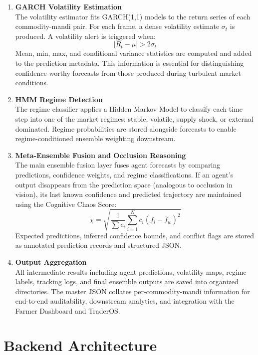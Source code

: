 \documentclass[12pt,a4paper]{report}
\theoremstyle{definition}
\theoremstyle{remark}
\begin{document}
\begin{enumerate}
\item \textbf{GARCH Volatility Estimation}\\
The volatility estimator fits GARCH(1,1) models to the return series of each commodity-mandi pair. For each frame, a dense volatility estimate $\sigma_t$ is produced. A volatility alert is triggered when:
\begin{equation}
|R_t - \mu| > 2\sigma_t
\end{equation}
Mean, min, max, and conditional variance statistics are computed and added to the prediction metadata. This information is essential for distinguishing confidence-worthy forecasts from those produced during turbulent market conditions.

\item \textbf{HMM Regime Detection}\\
The regime classifier applies a Hidden Markov Model to classify each time step into one of the market regimes: stable, volatile, supply shock, or external dominated. Regime probabilities are stored alongside forecasts to enable regime-conditioned ensemble weighting downstream.

\item \textbf{Meta-Ensemble Fusion and Occlusion Reasoning}\\
The main ensemble fusion layer fuses agent forecasts by comparing predictions, confidence weights, and regime classifications. If an agent's output disappears from the prediction space (analogous to occlusion in vision), its last known confidence and predicted trajectory are maintained using the Cognitive Chaos Score:
    \begin{equation}
    \chi = \sqrt{\frac{1}{\sum c_i} \sum_{i=1}^{N} c_i \left( f_i - \bar{f}_{w} \right)^2}
    \end{equation}
Expected predictions, inferred confidence bounds, and conflict flags are stored as annotated prediction records and structured JSON.

\item \textbf{Output Aggregation}\\
All intermediate results including agent predictions, volatility maps, regime labels, tracking logs, and final ensemble outputs are saved into organized directories. The master JSON collates per-commodity-mandi information for end-to-end auditability, downstream analytics, and integration with the Farmer Dashboard and TraderOS.
\end{enumerate}

\section{Backend Architecture}
\end{document}

